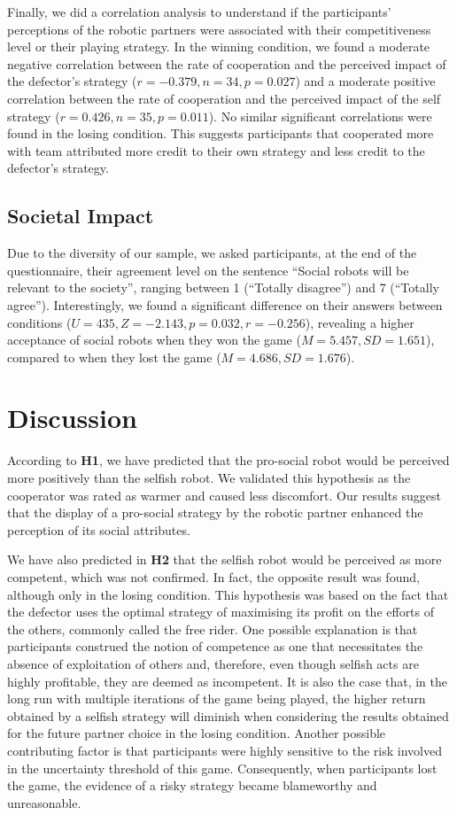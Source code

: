 Finally, we did a correlation analysis to understand if the participants' perceptions of the robotic partners were associated with their competitiveness level or their playing strategy. In the winning condition, we found a moderate negative correlation between the rate of cooperation and the perceived impact of the defector’s strategy ($r=-0.379, n=34, p=0.027$) and a moderate positive correlation between the rate of cooperation and the perceived impact of the self strategy ($r=0.426, n=35, p=0.011$). No similar significant correlations were found in the losing condition. This suggests participants that cooperated more with team attributed more credit to their own strategy and less credit to the defector's strategy.

\subsection{Societal Impact}
Due to the diversity of our sample, we asked participants, at the end of the questionnaire, their agreement level on the sentence ``Social robots will be relevant to the society'', ranging between 1 (``Totally disagree'') and 7 (``Totally agree'').
Interestingly, we found a significant difference on their answers between conditions ($U=435, Z=-2.143, p=0.032, r=-0.256$), revealing a higher acceptance of social robots when they won the game ($M=5.457, SD=1.651$), compared to when they lost the game ($M=4.686, SD=1.676$).



\section{Discussion}
\label{sec:study3-discussion}
According to \textbf{H1}, we have predicted that the pro-social robot would be perceived more positively than the selfish robot. We validated this hypothesis as the cooperator was rated as warmer and caused less discomfort. Our results suggest that the display of a pro-social strategy by the robotic partner enhanced the perception of its social attributes.

We have also predicted in \textbf{H2} that the selfish robot would be perceived as more competent, which was not confirmed. In fact, the opposite result was found, although only in the losing condition. This hypothesis was based on the fact that the defector uses the optimal strategy of maximising its profit on the efforts of the others, commonly called the free rider. One possible explanation is that participants construed the notion of competence as one that necessitates the absence of exploitation of others and, therefore, even though selfish acts are highly profitable, they are deemed as incompetent. It is also the case that, in the long run with multiple iterations of the game being played, the higher return obtained by a selfish strategy will diminish when considering the results obtained for the future partner choice in the losing condition. Another possible contributing factor is that participants were highly sensitive to the risk involved in the uncertainty threshold of this game. Consequently, when participants lost the game, the evidence of a risky strategy became blameworthy and unreasonable.


